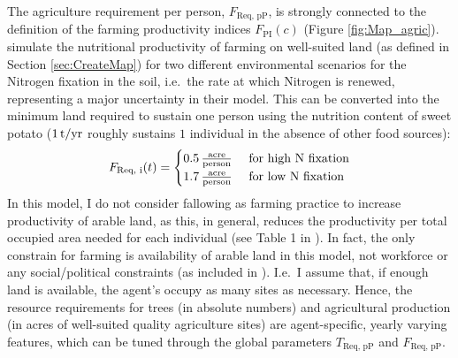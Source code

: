 The agriculture requirement per person, $F_\text{Req, pP}$, is strongly connected to the definition of the farming productivity indices $F_\text{PI}(c)$ (Figure \ref{fig:Map_agric}).
\citet{Puleston2017} simulate the nutritional productivity of farming on well-suited land (as defined in Section \ref{sec:CreateMap}) for two different environmental scenarios for the Nitrogen fixation in the soil, i.e.\ the rate at which Nitrogen is renewed, representing a major uncertainty in their model.
This can be converted into the minimum land required to sustain one person using the nutrition content of sweet potato ($1\, \rm{t/yr}$ roughly sustains $1$ individual in the absence of other food sources): 
\begin{equation}
F_\text{Req, i}(t) = \begin{cases}
	0.5 \, {\rm \frac{acre}{person} } & \text{ for high N fixation} \\
	1.7 \, {\rm \frac{acre}{person} } & \text{ for low N fixation} \\
 \end{cases}
\end{equation}
In this model, I do not consider fallowing as farming practice to increase productivity of arable land, as this, in general, reduces the productivity per total occupied area needed for each individual (see Table 1 in \citet{Puleston2017}).
In fact, the only constrain for farming is availability of arable land in this model, not workforce or any social/political constraints (as included in \citet{Puleston2017}).
I.e.\ I assume that, if enough land is available, the agent's occupy as many sites as necessary.
Hence, the resource requirements for trees (in absolute numbers) and agricultural production (in acres of well-suited quality agriculture sites) are agent-specific, yearly varying features, which can be tuned through the global parameters $T_\text{Req, pP}$ and $F_\text{Req, pP}$.

